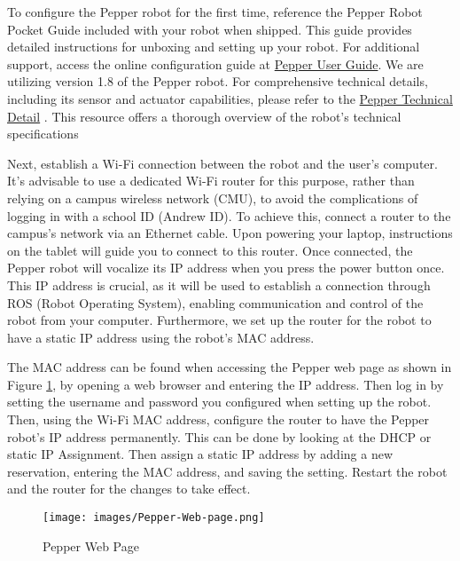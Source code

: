 \documentclass{CSSRforAfrica}
\begin{document}
{\label{setup_pepper}
To configure the Pepper robot for the first time, reference the Pepper Robot Pocket Guide included with your robot when shipped. This guide provides detailed instructions for unboxing and setting up your robot. For additional support, access the online configuration guide at \href{http://doc.aldebaran.com/2-5/family/pepper_user_guide/first_conf_pep.html}{Pepper User Guide}. We are utilizing version 1.8 of the Pepper robot. For comprehensive technical details, including its sensor and actuator capabilities, please refer to the 
\href{http://doc.aldebaran.com/2-5/family/pepper_technical/index_pep.html}{Pepper Technical Detail} \cite{SoftBankDocumentation}. This resource offers a thorough overview of the robot's technical specifications

Next, establish a Wi-Fi connection between the robot and the user's computer. It's advisable to use a dedicated Wi-Fi router for this purpose, rather than relying on a campus wireless network (CMU), to avoid the complications of logging in with a school ID (Andrew ID). To achieve this, connect a router to the campus's network via an Ethernet cable. Upon powering your laptop, instructions on the tablet will guide you to connect to this router. Once connected, the Pepper robot will vocalize its IP address when you press the power button once. This IP address is crucial, as it will be used to establish a connection through ROS (Robot Operating System), enabling communication and control of the robot from your computer. Furthermore, we set up the router for the robot to have a static IP address using the robot's MAC address. 

The MAC address can be found when accessing the Pepper web page as shown in Figure \ref{fig:pepper-web-page}, by opening a web browser and entering the IP address. Then log in by setting the username and password you configured when setting up the robot. Then, using the Wi-Fi MAC address, configure the router to have the Pepper robot's IP address permanently. This can be done by looking at the DHCP or static IP Assignment. Then assign a static IP address by adding a new reservation, entering the MAC  address, and saving the setting. Restart the robot and the router for the changes to take effect.

\begin{figure}[!hbpt]
\centering
\texttt{[image: images/Pepper-Web-page.png]}
\caption{Pepper Web Page}
\label{fig:pepper-web-page}
\end{figure}
}
\end{document}
